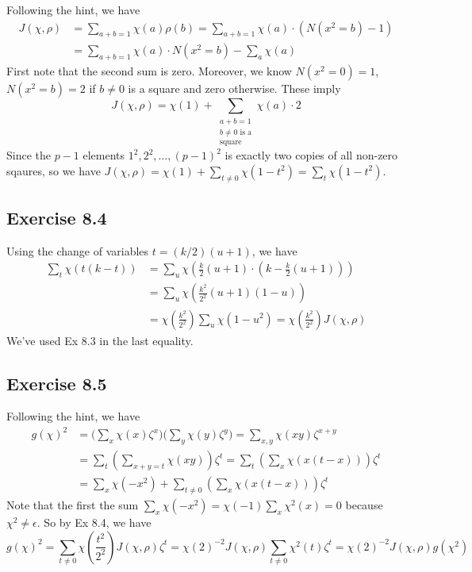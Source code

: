 \documentclass[../Chapter.tex]{subfiles}
\begin{document}
Following the hint, we have
\begin{align*}
J(\chi,\rho) &= \sum_{a+b=1} \chi(a)\rho(b)=\sum_{a+b=1} \chi(a)\cdot\left(N(x^2=b)-1\right) \\
&= \sum_{a+b=1} \chi(a)\cdot N(x^2=b)-\sum_a \chi(a)
\end{align*}
First note that the second sum is zero. Moreover, we know $N(x^2=0)=1$, $N(x^2=b)=2$ if $b\neq0$ is a square and zero otherwise. These imply $$J(\chi,\rho) = \chi(1) + \sum_{\substack{a+b=1\\ b\neq0 \text{ is a} \\ \text{square}}} \chi(a)\cdot 2$$
Since the $p-1$ elements $1^2,2^2,\ldots,(p-1)^2$ is exactly two copies of all non-zero sqaures, so we have $J(\chi,\rho) = \chi(1) + \sum_{t\neq0} \chi(1-t^2) = \sum_t \chi(1-t^2)$.

\subsection*{Exercise 8.4}

Using the change of variables $t=(k/2)(u+1)$, we have
\begin{align*}
\sum_t \chi(t(k-t)) &= \sum_u \chi\left(\frac{k}{2}(u+1)\cdot\left(k-\frac{k}{2}(u+1)\right)\right) \\
&= \sum_u \chi\left(\frac{k^2}{2^2}(u+1)(1-u)\right) \\ 
&= \chi\left(\frac{k^2}{2^2}\right)\sum_u \chi(1-u^2) = \chi\left(\frac{k^2}{2^2}\right) J(\chi,\rho)
\end{align*}
We've used Ex 8.3 in the last equality.

\subsection*{Exercise 8.5}

Following the hint, we have
\begin{align*}
g(\chi)^2 &= \Biggl(\sum_x \chi(x)\zeta^x\Biggr)\Biggl(\sum_y \chi(y)\zeta^y\Biggr) = \sum_{x,y} \chi(xy)\zeta^{x+y} \\
&= \sum_t \left(\sum_{x+y=t} \chi(xy)\right)\zeta^t = \sum_t \left(\sum_x \chi(x(t-x))\right)\zeta^t \\
&= \sum_x \chi(-x^2) + \sum_{t\neq0}\left(\sum_x \chi(x(t-x))\right)\zeta^t
\end{align*}
Note that the first the sum $\sum_x \chi(-x^2) = \chi(-1)\sum_x \chi^2(x) =0$ because $\chi^2\neq\epsilon$. So by Ex 8.4, we have
$$g(\chi)^2 = \sum_{t\neq0} \chi\left(\frac{t^2}{2^2}\right)J(\chi,\rho)\zeta^t = \chi(2)^{-2}J(\chi,\rho) \sum_{t\neq0}\chi^2(t)\zeta^t = \chi(2)^{-2}J(\chi,\rho)g(\chi^2)$$
\end{document}
